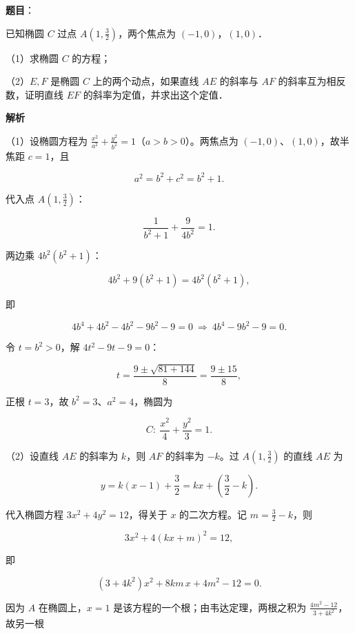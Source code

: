 \begin{answer}

\textbf{题目}：

已知椭圆 $C$ 过点 $A\left(1,\frac32\right)$，两个焦点为 $(-1,0)$，$(1,0)$．

（1）求椭圆 $C$ 的方程；

（2）$E,F$ 是椭圆 $C$ 上的两个动点，如果直线 $AE$ 的斜率与 $AF$ 的斜率互为相反数，证明直线 $EF$ 的斜率为定值，并求出这个定值．

\textbf{解析}

（1）设椭圆方程为 $\frac{x^2}{a^2}+\frac{y^2}{b^2}=1$（$a>b>0$）。两焦点为 $(-1,0)$、$(1,0)$，故半焦距 $c=1$，且

\nopagebreak[4]
\[a^2=b^2+c^2=b^2+1 .\]

代入点 $A\left(1,\frac32\right)$：

\nopagebreak[4]
\[\frac{1}{b^2+1}+\frac{9}{4b^2}=1 .\]

两边乘 $4b^2(b^2+1)$：

\nopagebreak[4]
\[4b^2+9(b^2+1)=4b^2(b^2+1),\]

即

\nopagebreak[4]
\[4b^4+4b^2-4b^2-9b^2-9=0
\ \Longrightarrow\ 4b^4-9b^2-9=0 .\]

令 $t=b^2>0$，解 $4t^2-9t-9=0$：

\nopagebreak[4]
\[t=\frac{9\pm\sqrt{81+144}}{8}
=\frac{9\pm15}{8},\]

正根 $t=3$，故 $b^2=3$、$a^2=4$，椭圆为

\nopagebreak[4]
\[C:\ \frac{x^2}{4}+\frac{y^2}{3}=1 .\]

（2）设直线 $AE$ 的斜率为 $k$，则 $AF$ 的斜率为 $-k$。过 $A\left(1,\frac32\right)$ 的直线 $AE$ 为

\nopagebreak[4]
\[y=k(x-1)+\frac32=kx+\left(\frac32-k\right).\]

代入椭圆方程 $3x^2+4y^2=12$，得关于 $x$ 的二次方程。记 $m=\frac32-k$，则

\nopagebreak[4]
\[3x^2+4(kx+m)^2=12,\]

即

\nopagebreak[4]
\[(3+4k^2)x^2+8km\,x+4m^2-12=0 .\]

因为 $A$ 在椭圆上，$x=1$ 是该方程的一个根；由韦达定理，两根之积为 $\frac{4m^2-12}{3+4k^2}$，故另一根


\end{answer}
